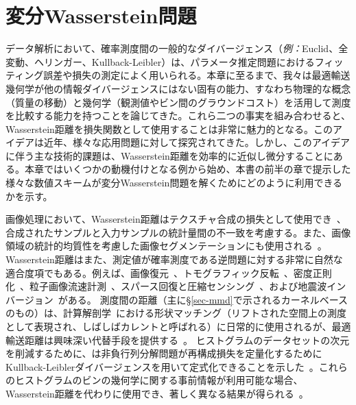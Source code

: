 
\chapter{変分Wasserstein問題}
\label{c-variational} %

データ解析において、確率測度間の一般的なダイバージェンス（\emph{例：}Euclid、全変動、ヘリンガー、Kullback-Leibler）は、パラメータ推定問題におけるフィッティング誤差や損失の測定によく用いられる。本章に至るまで、我々は最適輸送幾何学が他の情報ダイバージェンスにはない固有の能力、すなわち物理的な概念（質量の移動）と幾何学（観測値やビン間のグラウンドコスト）を活用して測度を比較する能力を持つことを論じてきた。これら二つの事実を組み合わせると、Wasserstein距離を損失関数として使用することは非常に魅力的となる。このアイデアは近年、様々な応用問題に対して探究されてきた。しかし、このアイデアに伴う主な技術的課題は、Wasserstein距離を効率的に近似し微分することにある。本章ではいくつかの動機付けとなる例から始め、本書の前半の章で提示した様々な数値スキームが変分Wasserstein問題を解くためにどのように利用できるかを示す。

画像処理において、Wasserstein距離はテクスチャ合成の損失として使用でき~\citep{2016-tartavel-siims}、合成されたサンプルと入力サンプルの統計量間の不一致を考慮する。また、画像領域の統計的均質性を考慮した画像セグメンテーションにも使用される~\citep{SchnorSegmentation,RabinPapadakisSSVM,peyre2012wasserstein,ni2009local,schmitzer2013object,liimage}。
%
Wasserstein距離はまた、測定値が確率測度である逆問題に対する非常に自然な適合度項でもある。例えば、画像復元~\citep{lellmann2014imaging}、トモグラフィック反転~\citep{AbrahamRadon}、密度正則化~\citep{Burger-JKO}、粒子画像流速計測~\citep{saumier2015optimal}、スパース回復と圧縮センシング~\citep{indyk2011k}、および地震波インバージョン~\citep{metivier2016optimal}がある。
%
測度間の距離（主に\S\ref{sec-mmd}で示されるカーネルベースのもの）は、計算解剖学~\citep{vaillant2005surface}における形状マッチング（リフトされた空間上の測度として表現され、しばしばカレントと呼ばれる）に日常的に使用されるが、最適輸送距離は興味深い代替手段を提供する~\citep{2017-feydy-miccai}。
%
ヒストグラムのデータセットの次元を削減するために、\citeauthor{lee1999learning}は非負行列分解問題が再構成損失を定量化するためにKullback-Leiblerダイバージェンスを用いて定式化できることを示した~\citep{lee1999learning}。これらのヒストグラムのビンの幾何学に関する事前情報が利用可能な場合、Wasserstein距離を代わりに使用でき、著しく異なる結果が得られる~\citep{Sandler09,ZenICPR14,pmlr-v51-rolet16}。

